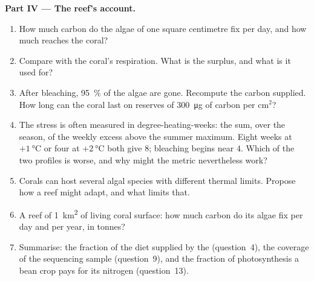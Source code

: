 \begin{problem}
\medskip
\noindent\textbf{Part IV --- The reef's account.}
\begin{enumerate}[resume]
  \item How much carbon do the algae of one square centimetre fix per
        day, and how much reaches the coral?
  \item Compare with the coral's respiration. What is the surplus, and
        what is it used for?
  \item After bleaching, \qty{95}{\%} of the algae are gone. Recompute the
        carbon supplied. How long can the coral last on reserves of
        \qty{300}{\micro g} of carbon per cm$^{2}$?
  \item The stress is often measured in degree-heating-weeks: the sum,
        over the season, of the weekly excess above the summer
        maximum. Eight weeks at $+\qty{1}{\celsius}$ or four at
        $+\qty{2}{\celsius}$ both give $8$; bleaching begins near $4$.
        Which of the two profiles is worse, and why might the metric
        nevertheless work?
  \item Corals can host several algal species with different thermal
        limits. Propose how a reef might adapt, and what limits that.
  \item A reef of \qty{1}{km^2} of living coral surface: how much
        carbon do its algae fix per day and per year, in tonnes?
  \item Summarise: the fraction of the diet supplied by the 
        (question~4), the coverage of the sequencing sample
        (question~9), and the fraction of photosynthesis a bean crop
        pays for its nitrogen (question~13).
\end{enumerate}
\end{problem}
